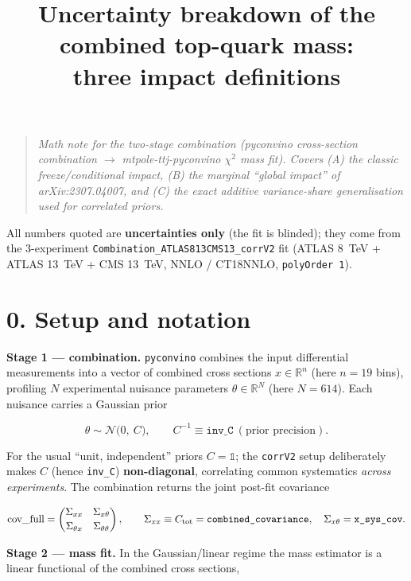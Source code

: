 \documentclass[11pt,a4paper]{article}
\title{Uncertainty breakdown of the combined top-quark mass:\\ three impact definitions}
\author{}
\date{}
\newcommand{\code}[1]{\texttt{#1}}
\begin{document}
\maketitle
\vspace{-2.5em}

\begin{quote}
\textit{Math note for the two-stage combination (pyconvino cross-section
combination $\to$ mtpole-ttj-pyconvino $\chi^2$ mass fit). Covers (A) the
classic freeze/conditional impact, (B) the marginal ``global impact'' of
arXiv:2307.04007, and (C) the exact additive variance-share generalisation used
for correlated priors.}
\end{quote}

All numbers quoted are \textbf{uncertainties only} (the fit is blinded); they come
from the 3-experiment \code{Combination\_ATLAS813CMS13\_corrV2} fit (ATLAS 8~TeV +
ATLAS 13~TeV + CMS 13~TeV, NNLO / CT18NNLO, \code{polyOrder 1}).

\section*{0. Setup and notation}

\textbf{Stage 1 --- combination.} \code{pyconvino} combines the input differential
measurements into a vector of combined cross sections $x\in\mathbb{R}^{n}$ (here
$n=19$ bins), profiling $N$ experimental nuisance parameters
$\theta\in\mathbb{R}^{N}$ (here $N=614$). Each nuisance carries a Gaussian prior

\[
\theta \sim \mathcal{N}\!\big(0,\ C\big),\qquad C^{-1}\equiv \code{inv\_C}\ (\text{prior precision}).
\]

For the usual ``unit, independent'' priors $C=\mathbb{1}$; the \code{corrV2} setup
deliberately makes $C$ (hence \code{inv\_C}) \textbf{non-diagonal}, correlating
common systematics \emph{across experiments}. The combination returns the joint
post-fit covariance

\[
\text{cov\_full}=
\begin{pmatrix}\Sigma_{xx} & \Sigma_{x\theta}\\[2pt] \Sigma_{\theta x} & \Sigma_{\theta\theta}\end{pmatrix},
\qquad
\Sigma_{xx}\equiv C_{\rm tot}=\code{combined\_covariance},\quad
\Sigma_{x\theta}=\code{x\_sys\_cov}.
\]

\textbf{Stage 2 --- mass fit.} In the Gaussian/linear regime the mass estimator is
a linear functional of the combined cross sections,
\end{document}
